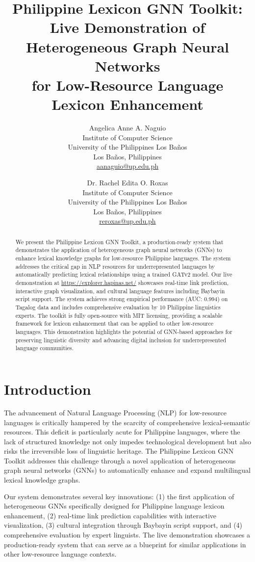 \documentclass[11pt]{article}
\title{Philippine Lexicon GNN Toolkit: \\Live Demonstration of Heterogeneous Graph Neural Networks \\for Low-Resource Language Lexicon Enhancement}
\author{
Angelica Anne A. Naguio \\
Institute of Computer Science \\
University of the Philippines Los Ba\~{n}os \\
Los Ba\~{n}os, Philippines \\
\url{aanaguio@up.edu.ph}
\and
Dr. Rachel Edita O. Roxas \\
Institute of Computer Science \\
University of the Philippines Los Ba\~{n}os \\
Los Ba\~{n}os, Philippines \\
\url{reroxas@up.edu.ph}
}
\newcommand{\url}[1]{\href{#1}{#1}}
\begin{document}
\maketitle

\begin{abstract}
We present the Philippine Lexicon GNN Toolkit, a production-ready system that demonstrates the application of heterogeneous graph neural networks (GNNs) to enhance lexical knowledge graphs for low-resource Philippine languages. The system addresses the critical gap in NLP resources for underrepresented languages by automatically predicting lexical relationships using a trained GATv2 model. Our live demonstration at \url{https://explorer.hapinas.net/} showcases real-time link prediction, interactive graph visualization, and cultural language features including Baybayin script support. The system achieves strong empirical performance (AUC: 0.994) on Tagalog data and includes comprehensive evaluation by 10 Philippine linguistics experts. The toolkit is fully open-source with MIT licensing, providing a scalable framework for lexicon enhancement that can be applied to other low-resource languages. This demonstration highlights the potential of GNN-based approaches for preserving linguistic diversity and advancing digital inclusion for underrepresented language communities.
\end{abstract}

\section{Introduction}

The advancement of Natural Language Processing (NLP) for low-resource languages is critically hampered by the scarcity of comprehensive lexical-semantic resources. This deficit is particularly acute for Philippine languages, where the lack of structured knowledge not only impedes technological development but also risks the irreversible loss of linguistic heritage. The Philippine Lexicon GNN Toolkit addresses this challenge through a novel application of heterogeneous graph neural networks (GNNs) to automatically enhance and expand multilingual lexical knowledge graphs.

Our system demonstrates several key innovations: (1) the first application of heterogeneous GNNs specifically designed for Philippine language lexicon enhancement, (2) real-time link prediction capabilities with interactive visualization, (3) cultural integration through Baybayin script support, and (4) comprehensive evaluation by expert linguists. The live demonstration showcases a production-ready system that can serve as a blueprint for similar applications in other low-resource language contexts.
\end{document}
